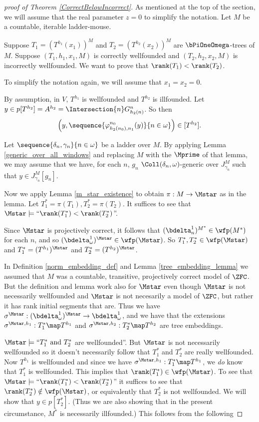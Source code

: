 \documentclass[oneside,12pt]{amsart}
\begin{document}
\begin{proof}[proof of Theorem \ref{CorrectBelowIncorrect}]
As mentioned at the top of the section, we will assume that the real parameter
$z=0$ to simplify the notation.
Let $M$ be a countable, iterable ladder-mouse.

Suppose $T_1 = (T^{h_1}(x_1))^M$ and $T_2 = (T^{h_2}(x_2))^M$ are 
$\bPiOneOmega$-trees of $M$. Suppose $(T_1,h_1,x_1,M)$ is correctly
wellfounded and $(T_2,h_2,x_2,M)$ is incorrectly wellfounded. 
We want to prove that $\rank(T_1) < \rank(T_2)$.

To simplify the notation again, we will assume that $x_1=x_2=0$.

By assumption, in $V$, $T^{h_1}$ is wellfounded and $T^{h_2}$ is illfounded. Let
$y\in p[T^{h_2}] = A^{h_2} = \Intersection{n} G^n_{h_2(n)}$.
So then
$$\left(y,\sequence{\varphi^{n_0}_{h_2(n_0),n_1}(y)}{n\in\omega} \right)\in[T^{h_2}].$$

Let $\sequence{\delta_n,\gamma_n}{n\in\omega}$ be a ladder over $M$.
By applying Lemma \ref{generic_over_all_windows} and replacing $M$ with the $\Mprime$ of
that lemma, we may assume that we have, for each $n$, $g_n$
$\Coll(\delta_n,\omega)$-generic over $J^M_{\gamma_n}$ such that $y\in J^M_{\gamma_n}[g_n]$.

Now we apply Lemma \ref{m_star_existence} to obtain $\pi:M\to\Mstar$ as in
the lemma.
Let $T_1^* = \pi(T_1), T_2^* = \pi(T_2)$.
It suffices to see that $\Mstar\models\text{``}\rank(T_1^*) < \rank(T_2^*)$''.

Since $\Mstar$ is projectively correct, it follows that $(\bdelta^1_n)^{M^*}\in\wfp(M^*)$
for each $n$, and so $(\bdelta^1_{\omega})^{\Mstar}\in\wfp(\Mstar)$. So
$T_1^*,T_2^*\in\wfp(\Mstar)$ and $T_1^* = (T^{h_1})^{\Mstar}$
and $T_2^* = (T^{h_2})^{\Mstar}$.

In Definition \ref{norm_embedding_def} and
Lemma \ref{tree_embedding_lemma} we assumed that $M$ was a countable, transitive, projectively correct model of $\ZFC$. But the definition and lemma work also for $\Mstar$ even though $\Mstar$ is not
necessarily wellfounded and $\Mstar$ is not necesarily a model of $\ZFC$, but rather it has
rank initial segments that are. Thus we have
$\sigma^{\Mstar}:(\bdelta^1_{\omega})^{\Mstar}\to\bdelta^1_{\omega}$, and
we have that the extensions
$\sigma^{\Mstar,h_1}:T_1^*\map T^{h_1}$ and $\sigma^{\Mstar,h_2}:T_2^*\map T^{h_2}$ are tree
embeddings.

$\Mstar\models \text{``}T_1^* \text{ and } T_2^*$ are wellfounded''. But $\Mstar$ is not
necessarily wellfounded so it doesn't necessarily follow that $T_1^*$ and $T_2^*$ are really wellfounded.
Now $T^{h_1}$ is wellfounded and since we have $\sigma^{\Mstar,h_1}:T_1^*\map T^{h_1}$,
we \emph{do} know that $T_1^*$ is wellfounded. This implies that
$\rank(T_1^*)\in\wfp(\Mstar)$.
To see that $\Mstar\models\text{``}\rank(T_1^*) < \rank(T_2^*)$'' it suffices to
see that $\rank(T_2^*)\notin\wfp(\Mstar)$, or equivalently that $T_2^*$ is not wellfounded.
We will show that $y\in p[T_2^*]$. (Thus we are also showing that in the present
circumstance, $M^*$ is necessarily illfounded.)
This follows from the following


\end{proof}
\end{document}
